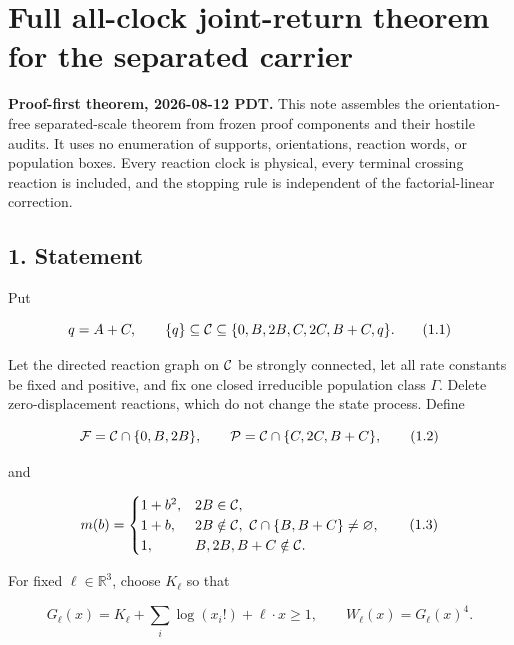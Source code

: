 \section{Full all-clock joint-return theorem for the separated
carrier}

\textbf{Proof-first theorem, 2026-08-12 PDT.} This note assembles the
orientation-free separated-scale theorem from frozen proof components
and their hostile audits. It uses no enumeration of supports,
orientations, reaction words, or population boxes. Every reaction clock
is physical, every terminal crossing reaction is included, and the
stopping rule is independent of the factorial-linear correction.

\subsection{1. Statement}

Put

\[
 q=A+C,\qquad
 \{q\}\subseteq{\cal C}
 \subseteq\{0,B,2B,C,2C,B+C,q\}.                         \tag{1.1}
\]

Let the directed reaction graph on \({\cal C}\) be strongly connected,
let all rate constants be fixed and positive, and fix one closed
irreducible population class \(\Gamma\). Delete zero-displacement
reactions, which do not change the state process. Define

\[
 {\cal F}={\cal C}\cap\{0,B,2B\},\qquad
 {\cal P}={\cal C}\cap\{C,2C,B+C\},                        \tag{1.2}
\]

and

\[
 m(b)=
 \begin{cases}
  1+b^2,&2B\in{\cal C},\\
  1+b,&2B\notin{\cal C},\
       {\cal C}\cap\{B,B+C\}\ne\varnothing,\\
  1,&B,2B,B+C\notin{\cal C}.
 \end{cases}                                               \tag{1.3}
\]

For fixed \(\ell\in\mathbb R^3\), choose \(K_\ell\) so that

\[
 G_\ell(x)=K_\ell+\sum_i\log(x_i!)+\ell\cdot x\ge1,
 \qquad W_\ell(x)=G_\ell(x)^4.                             \tag{1.4}
\]

